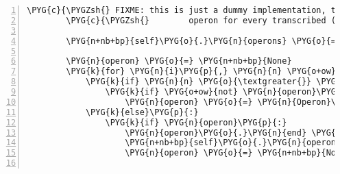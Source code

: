 \begin{Verbatim}[commandchars=\\\{\},numbers=left,firstnumber=1,stepnumber=5]
        \PYG{c}{\PYGZsh{} FIXME: this is just a dummy implementation, that predicts an}
        \PYG{c}{\PYGZsh{}        operon for every transcribed (i.e. coverage \textgreater{} 1) region}

        \PYG{n+nb+bp}{self}\PYG{o}{.}\PYG{n}{operons} \PYG{o}{=} \PYG{p}{[}\PYG{p}{]}

        \PYG{n}{operon} \PYG{o}{=} \PYG{n+nb+bp}{None}
        \PYG{k}{for} \PYG{n}{i}\PYG{p}{,} \PYG{n}{n} \PYG{o+ow}{in} \PYG{n+nb}{enumerate}\PYG{p}{(}\PYG{n+nb+bp}{self}\PYG{o}{.}\PYG{n}{coverage}\PYG{p}{)}\PYG{p}{:}
            \PYG{k}{if} \PYG{n}{n} \PYG{o}{\textgreater{}} \PYG{l+m+mi}{0}\PYG{p}{:}
                \PYG{k}{if} \PYG{o+ow}{not} \PYG{n}{operon}\PYG{p}{:}
                    \PYG{n}{operon} \PYG{o}{=} \PYG{n}{Operon}\PYG{p}{(}\PYG{n}{begin}\PYG{o}{=}\PYG{n}{i} \PYG{o}{+} \PYG{l+m+mi}{1}\PYG{p}{,} \PYG{n}{strand}\PYG{o}{=}\PYG{l+m+mi}{1}\PYG{p}{,} \PYG{n}{confidence}\PYG{o}{=}\PYG{l+m+mi}{1}\PYG{p}{)}
            \PYG{k}{else}\PYG{p}{:}
                \PYG{k}{if} \PYG{n}{operon}\PYG{p}{:}
                    \PYG{n}{operon}\PYG{o}{.}\PYG{n}{end} \PYG{o}{=} \PYG{n}{i}
                    \PYG{n+nb+bp}{self}\PYG{o}{.}\PYG{n}{operons}\PYG{o}{.}\PYG{n}{append}\PYG{p}{(}\PYG{n}{operon}\PYG{p}{)}
                    \PYG{n}{operon} \PYG{o}{=} \PYG{n+nb+bp}{None}


\end{Verbatim}
